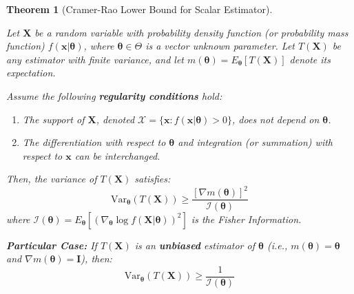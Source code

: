 \documentclass[
  letterpaper,
  DIV=11,
  numbers=noendperiod]{scrreprt}
\providecommand{\tightlist}{%
  \setlength{\itemsep}{0pt}\setlength{\parskip}{0pt}}
\renewcommand{\[}{\begin{equation}}
\renewcommand{\]}{\end{equation}}
\theoremstyle{definition}
\theoremstyle{plain}
\theoremstyle{plain}
\theoremstyle{plain}
\newtheorem{theorem}{Theorem}[chapter]
\theoremstyle{definition}
\theoremstyle{plain}
\theoremstyle{remark}
\begin{document}
\begin{theorem}[Cramer-Rao Lower Bound for Scalar
Estimator]\protect\hypertarget{thm-crlb}{}\label{thm-crlb}

Let \(\mathbf{X}\) be a random variable with probability density
function (or probability mass function)
\(f(\mathbf{x}|\boldsymbol{\theta})\), where
\(\boldsymbol{\theta} \in \Theta\) is a vector unknown parameter. Let
\(T(\mathbf{X})\) be any estimator with finite variance, and let
\(m(\boldsymbol{\theta}) = E_{\boldsymbol{\theta}}[T(\mathbf{X})]\)
denote its expectation.

Assume the following \textbf{regularity conditions} hold:

\begin{enumerate}
\def\labelenumi{\arabic{enumi}.}
\tightlist
\item
  The support of \(\mathbf{X}\), denoted
  \(\mathcal{X} = \{\mathbf{x} : f(\mathbf{x}|\boldsymbol{\theta}) > 0\}\),
  does not depend on \(\boldsymbol{\theta}\).
\item
  The differentiation with respect to \(\boldsymbol{\theta}\) and
  integration (or summation) with respect to \(\mathbf{x}\) can be
  interchanged.
\end{enumerate}

Then, the variance of \(T(\mathbf{X})\) satisfies: \[
\text{Var}_{\boldsymbol{\theta}}(T(\mathbf{X})) \ge \frac{[\nabla m(\boldsymbol{\theta})]^2}{\mathcal{I}(\boldsymbol{\theta})}
\] where
\(\mathcal{I}(\boldsymbol{\theta}) = E_{\boldsymbol{\theta}} \left[ \left( \nabla_{\boldsymbol{\theta}} \log f(\mathbf{X}|\boldsymbol{\theta}) \right)^2 \right]\)
is the Fisher Information.

\textbf{Particular Case:} If \(T(\mathbf{X})\) is an \textbf{unbiased}
estimator of \(\boldsymbol{\theta}\) (i.e.,
\(m(\boldsymbol{\theta}) = \boldsymbol{\theta}\) and
\(\nabla m(\boldsymbol{\theta})=\mathbf{I}\)), then: \[
\text{Var}_{\boldsymbol{\theta}}(T(\mathbf{X})) \ge \frac{1}{\mathcal{I}(\boldsymbol{\theta})}
\]

\end{theorem}
\end{document}
